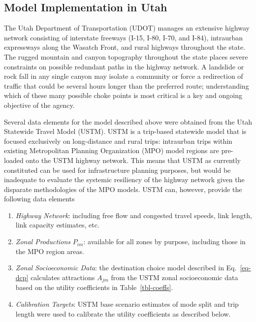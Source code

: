 \documentclass[]{ascelike-new}
\providecommand{\tightlist}{%
  \setlength{\itemsep}{0pt}\setlength{\parskip}{0pt}}\usepackage{longtable,booktabs,array}
\begin{document}
\hypertarget{model-implementation-in-utah}{%
\subsection{Model Implementation in
Utah}\label{model-implementation-in-utah}}

The Utah Department of Transportation (UDOT) manages an extensive
highway network consisting of interstate freeways (I-15, I-80, I-70, and
I-84), intraurban expressways along the Wasatch Front, and rural
highways throughout the state. The rugged mountain and canyon topography
throughout the state places severe constraints on possible redundant
paths in the highway network. A landslide or rock fall in any single
canyon may isolate a community or force a redirection of traffic that
could be several hours longer than the preferred route; understanding
which of these many possible choke points is most critical is a key and
ongoing objective of the agency.

Several data elements for the model described above were obtained from
the Utah Statewide Travel Model (USTM). USTM is a trip-based statewide
model that is focused exclusively on long-distance and rural trips:
intraurban trips within existing Metropolitan Planning Organization
(MPO) model regions are pre-loaded onto the USTM highway network. This
means that USTM as currently constituted can be used for infrastructure
planning purposes, but would be inadequate to evaluate the systemic
resiliency of the highway network given the disparate methodologies of
the MPO models. USTM can, however, provide the following data elements

\begin{enumerate}
\def\labelenumi{\arabic{enumi}.}
\tightlist
\item
  \emph{Highway Network}: including free flow and congested travel
  speeds, link length, link capacity estimates, etc.
\item
  \emph{Zonal Productions} \(P_{im}\): available for all zones by
  purpose, including those in the MPO region areas.
\item
  \emph{Zonal Socioeconomic Data}: the destination choice model
  described in Eq.~\ref{eq-dcp} calculates attractions \(A_{jm}\) from
  the USTM zonal socioeconomic data based on the utility coefficients in
  Table~\ref{tbl-coeffs}.
\item
  \emph{Calibration Targets}: USTM base scenario estimates of mode split
  and trip length were used to calibrate the utility coefficients as
  described below.
\end{enumerate}
\end{document}
